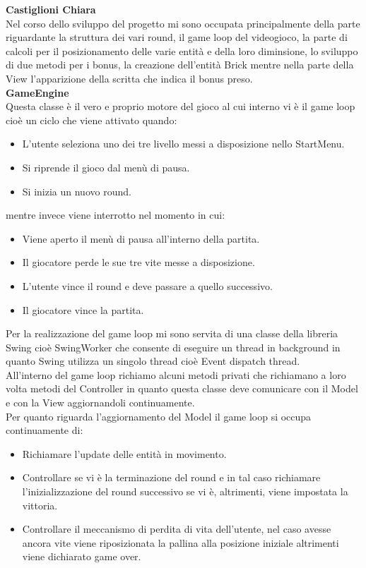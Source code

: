 \documentclass[a4paper,12pt]{report}
\begin{document}
\pagebreak
\textbf{Castiglioni Chiara}\\
Nel corso dello sviluppo del progetto mi sono occupata principalmente della parte riguardante la struttura dei vari round, il game loop del videogioco,
la parte di calcoli per il posizionamento delle varie entità e della loro diminsione, lo sviluppo di due metodi per i bonus, la creazione dell'entità Brick
mentre nella parte della View l'apparizione della scritta che indica il bonus preso.\\
\textbf{GameEngine}
\\Questa classe è il vero e proprio motore del gioco al cui interno vi è il game loop cioè un ciclo che viene attivato quando:
\begin{itemize}
    \item L'utente seleziona uno dei tre livello messi a disposizione nello StartMenu.
    \item Si riprende il gioco dal menù di pausa.
    \item Si inizia un nuovo round.
\end{itemize}
mentre invece viene interrotto nel momento in cui:
\begin{itemize}
    \item Viene aperto il menù di pausa all'interno della partita.
    \item Il giocatore perde le sue tre vite messe a disposizione.
    \item L'utente vince il round e deve passare a quello successivo.
    \item Il giocatore vince la partita.
\end{itemize}
Per la realizzazione del game loop mi sono servita di una classe della libreria Swing cioè SwingWorker che consente di eseguire un thread in background
in quanto Swing utilizza un singolo thread cioè Event dispatch thread.
\\All'interno del game loop richiamo alcuni metodi privati che richiamano a loro volta metodi del Controller in quanto questa classe deve comunicare con il Model
e con la View aggiornandoli continuamente.
\\Per quanto riguarda l'aggiornamento del Model il game loop si occupa continuamente di:
\begin{itemize}
    \item Richiamare l'update delle entità in movimento.
    \item Controllare se vi è la terminazione del round e in tal caso richiamare l'inizializzazione del round successivo se vi è, altrimenti, viene impostata la vittoria.
    \item Controllare il meccanismo di perdita di vita dell'utente, nel caso avesse ancora vite viene riposizionata la pallina alla posizione iniziale altrimenti viene dichiarato game over.
\end{itemize}
\end{document}
